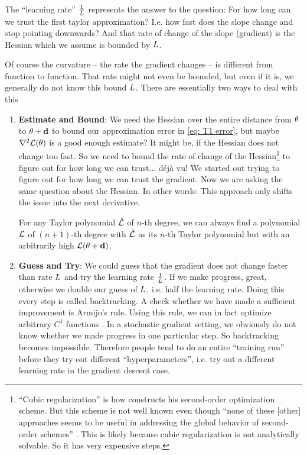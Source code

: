 The ``learning rate'' \(\frac1{L}\) represents the answer to the question:
For how long can we trust the first taylor approximation? I.e. how fast does
the slope change and stop pointing downwards? And that rate of change of the
slope (gradient) is the Hessian which we assume is bounded by \(L\).

Of course the curvature -- the rate the gradient changes -- is different from
function to function. That rate might not even be bounded, but even if it is,
we generally do not know this bound \(L\). There are essentially two ways
to deal with this
\begin{enumerate}
	\item \textbf{Estimate and Bound}: We need the Hessian over the entire distance
	from \(\theta\) to \(\theta + \mathbf{d}\) to bound our approximation error in
	\eqref{eq: T1 error}, but maybe \(\nabla^2\mathcal{L}(\theta)\) is a good enough
	estimate? It might be, if the Hessian does not change too fast. So we need
	to bound the rate of change of the Hessian\footnote{
		``Cubic regularization'' is how \textcite[Section
		4.1]{nesterovLecturesConvexOptimization2018} constructs his second-order
		optimization scheme. But this scheme is not well known even though ``none
		of these [other] approaches seems to be useful in addressing the global
		behavior of second-order schemes'' \parencite[p.
		242]{nesterovLecturesConvexOptimization2018}. This is likely because cubic
		regularization is not analytically solvable. So it has very expensive
		steps.
	} to figure out for how long we can
	trust... déjà vu! We started out trying to figure out for how long we
	can trust the gradient. Now we are asking the same question about the
	Hessian. In other words: This approach only shifts the issue into the next
	derivative.

	For any Taylor polynomial \(\hat{\mathcal{L}}\) of \(n\)-th degree, we can always
	find a polynomial \(\mathcal{L}\) of \((n+1)\)-th degree with \(\hat{\mathcal{L}}\) as
	its \(n\)-th Taylor polynomial but with an arbitrarily high \(\mathcal{L}(\theta +
	\mathbf{d})\).

	\item \textbf{Guess and Try}: We could guess that the gradient does not
	change faster than rate \(L\) and try the learning rate \(\frac1{L}\).
	If we make progress, great, otherwise we double our guess of \(L\),
	i.e. half the learning rate. Doing this every step is called backtracking. A
	check whether we have made a sufficient improvement is Armijo's rule. Using
	this rule, we can in fact optimize arbitrary \(C^1\) functions
	\parencite{truongBacktrackingGradientDescent2019}. In a stochastic gradient
	setting, we obviously do not know whether we made progress in one particular
	step. So backtracking becomes impossible. Therefore people tend to do an
	entire ``training run'' before they try out different ``hyperparameters'',
	i.e.  try out a different learning rate in the gradient descent case.
\end{enumerate}

